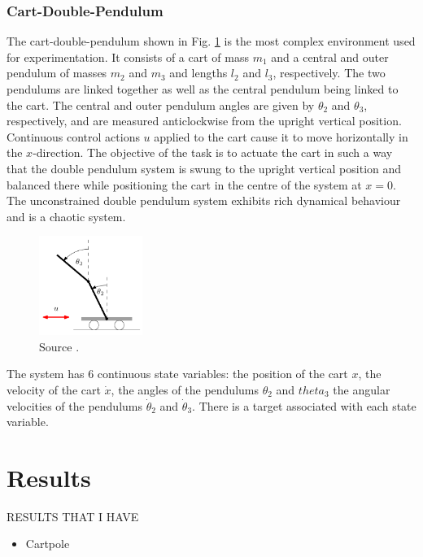 \subsubsection{Cart-Double-Pendulum}
The cart-double-pendulum shown in Fig. \ref{Fig:cartDoublePendulum-environment} is the most complex environment used for experimentation. It consists of a cart of mass $m_1$ and a central and outer pendulum of masses $m_2$ and $m_3$ and lengths $l_2$ and $l_3$, respectively. The two pendulums are linked together as well as the central pendulum being linked to the cart.  The central and outer pendulum angles are given by $\theta_2$ and $\theta_3$, respectively, and are measured anticlockwise from the upright vertical position. Continuous control actions $u$ applied to the cart cause it to move horizontally in the $x$-direction. The objective of the task is to actuate the cart in such a way that the double pendulum system is swung to the upright vertical position and balanced there while positioning the cart in the centre of the system at $x=0$. The unconstrained double pendulum system exhibits rich dynamical behaviour and is a chaotic system.
\begin{figure}[H]
\centering    
\includegraphics[width=0.3\textwidth]{Chapter3/Figures/cart-double-pendulum.png}
\caption[Cart-double-pendulum PILCO environment]{Source \cite{deisenroth2013pilco-documentation}.}
\label{Fig:cartDoublePendulum-environment}
\end{figure}
The system has 6 continuous state variables: the position of the cart $x$, the velocity of the cart $\dot x$, the angles of the pendulums $\theta_2$ and $theta_3$ the angular velocities of the pendulums $\dot \theta_2$ and $\dot \theta_3$. There is a target associated with each state variable.



\section{Results}
RESULTS THAT I HAVE
\begin{itemize}
    \item Cartpole
\end{itemize}

